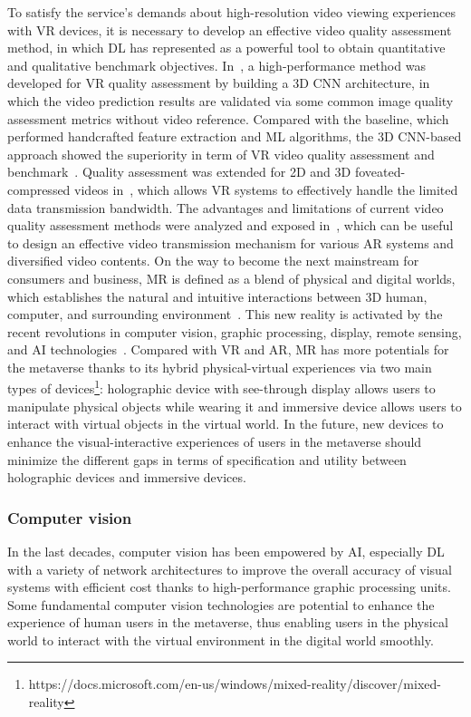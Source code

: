 \documentclass[journal]{IEEEtran}
\begin{document}
To satisfy the service’s demands about high-resolution video viewing experiences with VR devices, it is necessary to develop an effective video quality assessment method, in which DL has represented as a powerful tool to obtain quantitative and qualitative benchmark objectives. In~\cite{wu2019virtual}, a high-performance method was developed for VR quality assessment by building a 3D CNN architecture, in which the video prediction results are validated via some common image quality assessment metrics without video reference. 
Compared with the baseline, which performed handcrafted feature extraction and ML algorithms, the 3D CNN-based approach showed the superiority in term of VR video quality assessment and benchmark~\cite{yang20183d}. 
Quality assessment was extended for 2D and 3D foveated-compressed videos in~\cite{jin2021subjective}, which allows VR systems to effectively handle the limited data transmission bandwidth. 
The advantages and limitations of current video quality assessment methods were analyzed and exposed in~\cite{han2020accuracy}, which can be useful to design an effective video transmission mechanism for various AR systems and diversified video contents. 
On the way to become the next mainstream for consumers and business, MR is defined as a blend of physical and digital worlds, which establishes the natural and intuitive interactions between 3D human, computer, and surrounding environment~\cite{barba2012here}. 
This new reality is activated by the recent revolutions in computer vision, graphic processing, display, remote sensing, and AI technologies~\cite{kersten2012dvv}.
Compared with VR and AR, MR has more potentials for the metaverse thanks to its hybrid physical-virtual experiences via two main types of devices\footnote{https://docs.microsoft.com/en-us/windows/mixed-reality/discover/mixed-reality}: holographic device with see-through display allows users to manipulate physical objects while wearing it and immersive device allows users to interact with virtual objects in the virtual world.
In the future, new devices to enhance the visual-interactive experiences of users in the metaverse should minimize the different gaps in terms of specification and utility between holographic devices and immersive devices.


\subsubsection{Computer vision}
In the last decades, computer vision has been empowered by AI, especially DL with a variety of network architectures to improve the overall accuracy of visual systems with efficient cost thanks to high-performance graphic processing units.
Some fundamental computer vision technologies are potential to enhance the experience of human users in the metaverse, thus enabling users in the physical world to interact with the virtual environment in the digital world smoothly.
\end{document}
